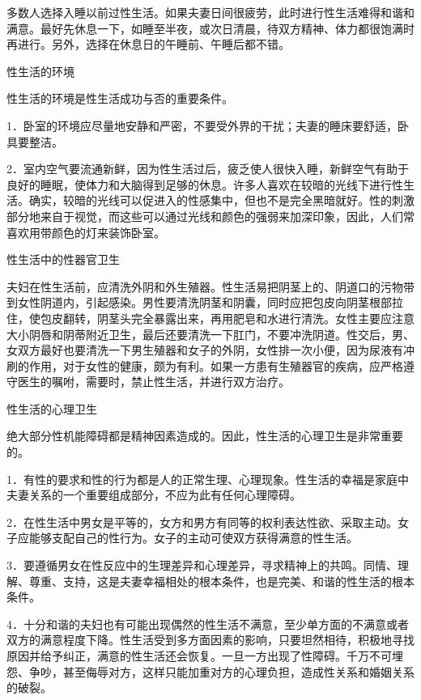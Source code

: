 \documentclass[12pt,UTF8]{ctexbook}
\begin{document}
多数人选择入睡以前过性生活。如果夫妻日间很疲劳，此时进行性生活难得和谐和满意。最好先休息一下，如睡至半夜，或次日清晨，待双方精神、体力都很饱满时再进行。另外，选择在休息日的午睡前、午睡后都不错。





性生活的环境


性生活的环境是性生活成功与否的重要条件。

1．卧室的环境应尽量地安静和严密，不要受外界的干扰；夫妻的睡床要舒适，卧具要整洁。

2．室内空气要流通新鲜，因为性生活过后，疲乏使人很快入睡，新鲜空气有助于良好的睡眠，使体力和大脑得到足够的休息。许多人喜欢在较暗的光线下进行性生活。确实，较暗的光线可以促进入的性感集中，但也不是完全黑暗就好。性的刺激部分地来自于视觉，而这些可以通过光线和颜色的强弱来加深印象，因此，人们常喜欢用带颜色的灯来装饰卧室。





性生活中的性器官卫生


夫妇在性生活前，应清洗外阴和外生殖器。性生活易把阴茎上的、阴道口的污物带到女性阴道内，引起感染。男性要清洗阴茎和阴囊，同时应把包皮向阴茎根部拉住，使包皮翻转，阴茎头完全暴露出来，再用肥皂和水进行清洗。女性主要应注意大小阴唇和阴蒂附近卫生，最后还要清洗一下肛门，不要冲洗阴道。性交后，男、女双方最好也要清洗一下男生殖器和女子的外阴，女性排一次小便，因为尿液有冲刷的作用，对于女性的健康，颇为有利。如果一方患有生殖器官的疾病，应严格遵守医生的嘱咐，需要时，禁止性生活，并进行双方治疗。





性生活的心理卫生


绝大部分性机能障碍都是精神因素造成的。因此，性生活的心理卫生是非常重要的。

1．有性的要求和性的行为都是人的正常生理、心理现象。性生活的幸福是家庭中夫妻关系的一个重要组成部分，不应为此有任何心理障碍。

2．在性生活中男女是平等的，女方和男方有同等的权利表达性欲、采取主动。女子应能够支配自己的性行为。女子的主动可使双方获得满意的性生活。

3．要遵循男女在性反应中的生理差异和心理差异，寻求精神上的共鸣。同情、理解、尊重、支持，这是夫妻幸福相处的根本条件，也是完美、和谐的性生活的根本条件。

4．十分和谐的夫妇也有可能出现偶然的性生活不满意，至少单方面的不满意或者双方的满意程度下降。性生活受到多方面因素的影响，只要坦然相待，积极地寻找原因并给予纠正，满意的性生活还会恢复。一旦一方出现了性障碍。千万不可埋怨、争吵，甚至侮辱对方，这样只能加重对方的心理负担，造成性关系和婚姻关系的破裂。
\end{document}

